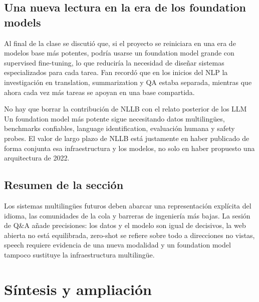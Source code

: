 \documentclass[a4paper]{article}
\begin{document}
\subsection{Una nueva lectura en la era de los foundation models}

Al final de la clase se discutió que, si el proyecto se reiniciara en una era de modelos base más potentes, podría usarse un foundation model grande con supervised fine-tuning, lo que reduciría la necesidad de diseñar sistemas especializados para cada tarea. Fan recordó que en los inicios del NLP la investigación en translation, summarization y QA estaba separada, mientras que ahora cada vez más tareas se apoyan en una base compartida.


\begin{warningbox}{No hay que borrar la contribución de NLLB con el relato posterior de los LLM}
Un foundation model más potente sigue necesitando datos multilingües, benchmarks confiables, language identification, evaluación humana y safety probes. El valor de largo plazo de NLLB está justamente en haber publicado de forma conjunta esa infraestructura y los modelos, no solo en haber propuesto una arquitectura de 2022.
\end{warningbox}

\subsection{Resumen de la sección}

Los sistemas multilingües futuros deben abarcar una representación explícita del idioma, las comunidades de la cola y barreras de ingeniería más bajas. La sesión de Q\&A añade precisiones: los datos y el modelo son igual de decisivos, la web abierta no está equilibrada, zero-shot se refiere sobre todo a direcciones no vistas, speech requiere evidencia de una nueva modalidad y un foundation model tampoco sustituye la infraestructura multilingüe.
\section{Síntesis y ampliación}
\end{document}
